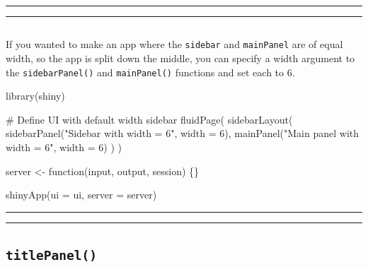 \documentclass[
  letterpaper,
  DIV=11,
  numbers=noendperiod]{scrreprt}
\newenvironment{Shaded}{\begin{snugshade}}{\end{snugshade}}
\newcommand{\AttributeTok}[1]{\textcolor[rgb]{0.40,0.46,0.14}{#1}}
\newcommand{\CommentTok}[1]{\textcolor[rgb]{0.37,0.37,0.37}{#1}}
\newcommand{\ControlFlowTok}[1]{\textcolor[rgb]{0.00,0.46,0.62}{#1}}
\newcommand{\DecValTok}[1]{\textcolor[rgb]{0.68,0.00,0.00}{#1}}
\newcommand{\FunctionTok}[1]{\textcolor[rgb]{0.28,0.35,0.67}{#1}}
\newcommand{\NormalTok}[1]{\textcolor[rgb]{0.00,0.46,0.62}{#1}}
\newcommand{\OtherTok}[1]{\textcolor[rgb]{0.00,0.46,0.62}{#1}}
\newcommand{\StringTok}[1]{\textcolor[rgb]{0.13,0.47,0.30}{#1}}
\begin{document}
\begin{center}\rule{0.5\linewidth}{0.5pt}\end{center}

\begin{center}\rule{0.5\linewidth}{0.5pt}\end{center}

\hypertarget{section-60}{%
\subsection{}\label{section-60}}

If you wanted to make an app where the \texttt{sidebar} and
\texttt{mainPanel} are of equal width, so the app is split down the
middle, you can specify a width argument to the \texttt{sidebarPanel()}
and \texttt{mainPanel()} functions and set each to 6.

\begin{Shaded}
\begin{Highlighting}[]
\FunctionTok{library}\NormalTok{(shiny)}

\CommentTok{\# Define UI with default width sidebar}
\FunctionTok{fluidPage}\NormalTok{(}
  \FunctionTok{sidebarLayout}\NormalTok{(}
    \FunctionTok{sidebarPanel}\NormalTok{(}\StringTok{"Sidebar with width = 6"}\NormalTok{, }\AttributeTok{width =} \DecValTok{6}\NormalTok{),}
    \FunctionTok{mainPanel}\NormalTok{(}\StringTok{"Main panel with width = 6"}\NormalTok{, }\AttributeTok{width =} \DecValTok{6}\NormalTok{)}
\NormalTok{  )}
\NormalTok{)}

\NormalTok{server }\OtherTok{\textless{}{-}} \ControlFlowTok{function}\NormalTok{(input, output, session) \{\}}

\FunctionTok{shinyApp}\NormalTok{(}\AttributeTok{ui =}\NormalTok{ ui, }\AttributeTok{server =}\NormalTok{ server)}
\end{Highlighting}
\end{Shaded}

\begin{center}\rule{0.5\linewidth}{0.5pt}\end{center}

\begin{center}\rule{0.5\linewidth}{0.5pt}\end{center}

\hypertarget{titlepanel}{%
\subsection{\texorpdfstring{\texttt{titlePanel()}}{titlePanel()}}\label{titlepanel}}
\end{document}
